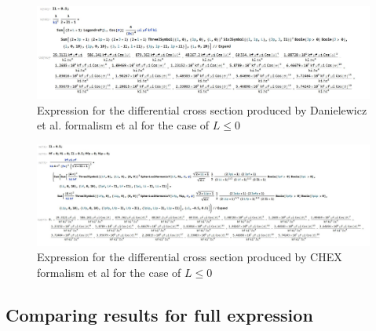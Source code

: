 \documentclass{article}
\begin{document}
\begin{figure}[H]
	\centering 
    \includegraphics[width=1\textwidth]{PawelfullLformalism.JPG}
    \caption{Expression for the differential cross section produced by Danielewicz et al. formalism et al for the case of $L \le 0$}
    \label{fig:spin0}
\end{figure}

\begin{figure}[H]
	\centering 
    \includegraphics[width=1\textwidth]{TerrifullLformalism.JPG}
    \caption{Expression for the differential cross section produced by CHEX formalism et al for the case of $L \le 0$}
    \label{fig:spin0}
\end{figure}

\subsection{Comparing results for full expression}



\end{document}
